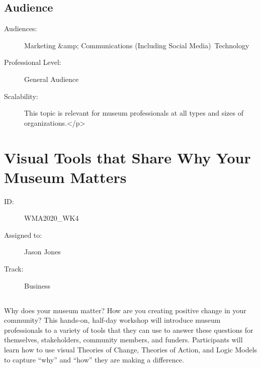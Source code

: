 \documentclass{report}
\begin{document}
              \subsection*{Audience}
                \begin{description}
                  \item [Audiences:]Marketing &amp; Communications (Including Social Media)~Technology~
                  \item[Professional Level:]General Audience~
                \item[Scalability:] This topic is relevant for museum professionals at all types and sizes of organizations.</p>
							
              \end{description}




    
  
        
          \newpage
          \section{ Visual Tools that Share Why Your Museum Matters  }
            \begin{description}
              \item [ID:]
              WMA2020\_WK4

              \item [Assigned to:]Jason Jones~
                \item [Track:]Business~
              \end{description}
              \subsection*{}
                Why does your museum matter? How are you creating positive change in your community? This hands-on, half-day workshop will introduce museum professionals to a variety of tools that they can use to answer these questions for themselves, stakeholders, community members, and funders. Participants will learn how to use visual Theories of Change, Theories of Action, and Logic Models to capture “why” and “how” they are making a difference.
\end{document}
